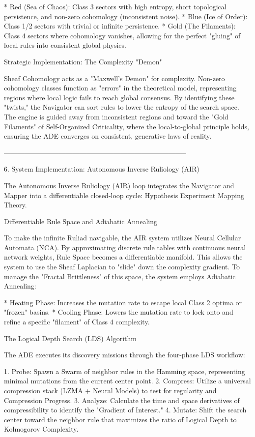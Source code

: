 * Red (Sea of Chaos): Class 3 sectors with high entropy, short topological persistence, and non-zero cohomology (inconsistent noise).
* Blue (Ice of Order): Class 1/2 sectors with trivial or infinite persistence.
* Gold (The Filaments): Class 4 sectors where cohomology vanishes, allowing for the perfect "gluing" of local rules into consistent global physics.

Strategic Implementation: The Complexity "Demon"

Sheaf Cohomology acts as a "Maxwell’s Demon" for complexity. Non-zero cohomology classes function as "errors" in the theoretical model, representing regions where local logic fails to reach global consensus. By identifying these "twists," the Navigator can sort rules to lower the entropy of the search space. The engine is guided away from inconsistent regions and toward the "Gold Filaments" of Self-Organized Criticality, where the local-to-global principle holds, ensuring the ADE converges on consistent, generative laws of reality.


--------------------------------------------------------------------------------


6. System Implementation: Autonomous Inverse Ruliology (AIR)

The Autonomous Inverse Ruliology (AIR) loop integrates the Navigator and Mapper into a differentiable closed-loop cycle: Hypothesis \rightarrow Experiment \rightarrow Mapping \rightarrow Theory.

Differentiable Rule Space and Adiabatic Annealing

To make the infinite Ruliad navigable, the AIR system utilizes Neural Cellular Automata (NCA). By approximating discrete rule tables with continuous neural network weights, Rule Space becomes a differentiable manifold. This allows the system to use the Sheaf Laplacian to "slide" down the complexity gradient. To manage the "Fractal Brittleness" of this space, the system employs Adiabatic Annealing:

* Heating Phase: Increases the mutation rate to escape local Class 2 optima or "frozen" basins.
* Cooling Phase: Lowers the mutation rate to lock onto and refine a specific "filament" of Class 4 complexity.

The Logical Depth Search (LDS) Algorithm

The ADE executes its discovery missions through the four-phase LDS workflow:

1. Probe: Spawn a Swarm of neighbor rules in the Hamming space, representing minimal mutations from the current center point.
2. Compress: Utilize a universal compression stack (LZMA + Neural Models) to test for regularity and Compression Progress.
3. Analyze: Calculate the time and space derivatives of compressibility to identify the "Gradient of Interest."
4. Mutate: Shift the search center toward the neighbor rule that maximizes the ratio of Logical Depth to Kolmogorov Complexity.

